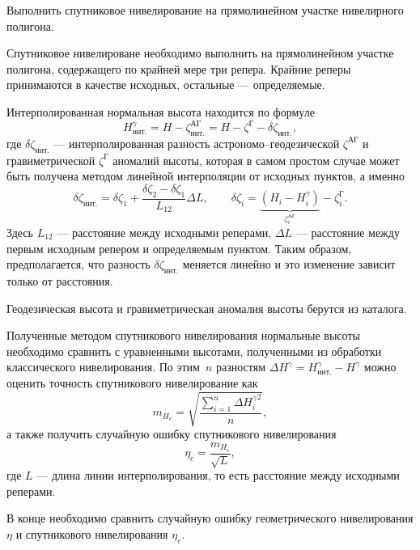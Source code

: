 \documentclass[11pt, a4paper,addpoints]{exam}
\theoremstyle{remark}
\newcommand{\zetaag}{\zeta^{\textrm{АГ}}}
\newcommand{\zetag}{\zeta^{\textrm{Г}}}
\begin{document}
\begin{questions}
    \question Выполнить спутниковое нивелирование на прямолинейном участке нивелирного полигона.

    Спутниковое нивелироване необходимо выполнить на прямолинейном участке полигона, содержащего по
    крайней мере три репера. Крайние реперы принимаются в качестве исходных, остальные ---
    определяемые.

    Интерполированная нормальная высота находится по формуле
    \begin{equation*}
        H_{\textrm{инт.}}^\gamma = H - \zetaag_{\textrm{инт.}} = H - \zetag -
        \delta\zeta_{\textrm{инт.}},
    \end{equation*}
    где $\delta\zeta_{\textrm{инт.}}$ --- интерполированная разность  астрономо--геодезической
    $\zetaag$ и
    гравиметрической $\zetag$ аномалий высоты, которая в самом простом случае 
    может быть получена методом линейной интерполяции от исходных пунктов, а именно
    \begin{equation*}
        \delta\zeta_{\textrm{инт.}} =
        \delta\zeta_1 + \dfrac{\delta\zeta_2 - \delta\zeta_1}{L_{12}} \Delta L,\qquad 
        \delta\zeta_i = \underbrace{\left( H_i - H^\gamma_i \right)}_{\zetaag_i} - \zetag_i.
    \end{equation*}
    Здесь $L_{12}$ --- расстояние между исходными реперами, $\Delta L$ --- расстояние между первым исходным
    репером и определяемым пунктом. Таким образом, предполагается, что разность $\delta\zeta_{\textrm{инт.}}$
    меняется линейно и это изменение зависит только от расстояния.

    Геодезическая высота и гравиметрическая аномалия высоты берутся из каталога.

    Полученные методом спутникового нивелирования нормальные высоты необходимо сравнить с
    уравненными высотами, полученными из обработки классического нивелирования. По этим~$n$ разностям
    $\Delta H^\gamma = H_{\textrm{инт.}}^\gamma - H^\gamma$ можно оценить точность спутникового нивелирование как
    \begin{equation*}
        m_{H_c} = \sqrt{\dfrac{\sum\limits_{i=1}^n{\Delta H^\gamma_i}^2}{n}},
    \end{equation*}
    а также получить случайную ошибку спутникового нивелирования
    \begin{equation*}
        \eta_c = \dfrac{m_{H_c}}{\sqrt{L}},
    \end{equation*}
    где $L$ --- длина линии интерполирования, то есть расстояние между исходными реперами.

    В конце необходимо сравнить случайную ошибку геометрического нивелирования  $\eta$ и
    спутникового нивелирования $\eta_c$.

\end{questions}
\end{document}
